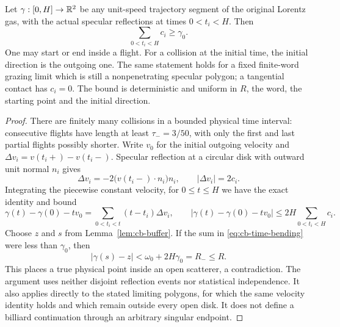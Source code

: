 \begin{theorem}
\label{thm:cb-time-bending}
Let $\gamma:[0,H]\to\mathbb R^2$ be any unit-speed trajectory segment of
the original Lorentz gas, with the actual specular reflections at
times $0<t_i<H$.  Then
\begin{equation}\label{eq:cb-time-bending}
 \sum_{0<t_i<H}c_i\geq\gamma_0.
\end{equation}
One may start or end inside a flight.  For a collision at the initial
time, the initial direction is the outgoing one.  The same statement
holds for a fixed finite-word grazing limit which is still a
nonpenetrating specular polygon; a tangential contact has $c_i=0$.
The bound is deterministic and uniform in $R$, the word, the starting
point and the initial direction.
\end{theorem}
\begin{proof}
There are finitely many collisions in a bounded physical time
interval: consecutive flights have length at least
$\tau_-=3/50$, with only the first and last partial flights possibly
shorter.  Write $v_0$ for the initial outgoing velocity and
$\Delta v_i=v(t_i+)-v(t_i-)$.  Specular reflection at a circular
disk with outward unit normal $n_i$ gives
\[
 \Delta v_i=-2\bigl(v(t_i-)\cdot n_i\bigr)n_i,
 \qquad |\Delta v_i|=2c_i.
\]
Integrating the piecewise constant velocity, for $0\leq t\leq H$
we have the exact identity and bound
\begin{equation}\label{eq:cb-polygon-deviation}
 \gamma(t)-\gamma(0)-tv_0
   =\sum_{0<t_i<t}(t-t_i)\Delta v_i,
 \qquad
 |\gamma(t)-\gamma(0)-tv_0|
   \leq 2H\sum_{0<t_i<H}c_i.
\end{equation}
Choose $z$ and $s$ from Lemma~\ref{lem:cb-buffer}.  If the sum in
\eqref{eq:cb-time-bending} were less than $\gamma_0$, then
\[
 |\gamma(s)-z|
 <\omega_0+2H\gamma_0=R_-\leq R.
\]
This places a true physical point inside an open scatterer, a
contradiction.  The argument uses neither disjoint reflection events
nor statistical independence.  It also applies directly to the stated
limiting polygons, for which the same velocity identity holds and
which remain outside every open disk.  It does not define a billiard
continuation through an arbitrary singular endpoint.
\end{proof}

